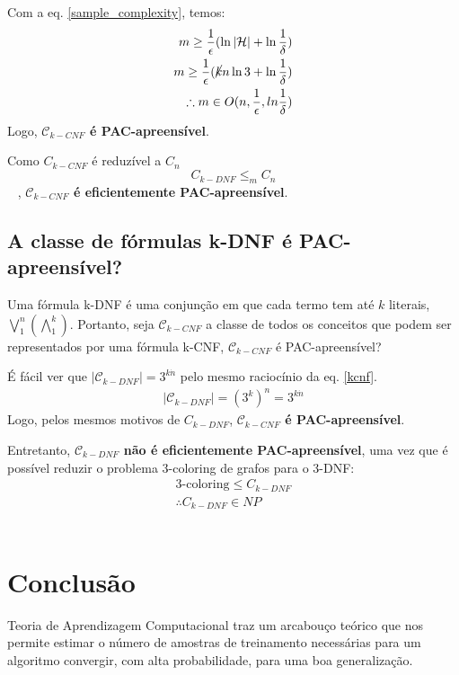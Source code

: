 \documentclass[
10pt, %
a4paper, %
onecolumn, %
]{article}
\begin{document}
Com a eq. \ref{sample_complexity}, temos:
\begin{align}
    m \geq \frac{1}{\epsilon}(\ln{|\mathcal{H}|} + \ln{\frac{1}{\delta}})\\
    m \geq \frac{1}{\epsilon}(\cancel{k} n \ln{3} + \ln{\frac{1}{\delta}}) \\
    \therefore m \in O(n, \frac{1}{\epsilon}, ln{\frac{1}{\delta}}) 
\end{align}
Logo, \textbf{$\mathcal{C}_{k-CNF}$ é PAC-apreensível}. 

Como $C_{k-CNF}$ é reduzível a $C_n$ \begin{equation}
C_{k-DNF}\leq_{m}C_n \end{equation}~\cite[pg. 18]{FoundationsML}
, \textbf{$\mathcal{C}_{k-CNF}$ é eficientemente PAC-apreensível}. 


\subsection{A classe de fórmulas k-DNF é PAC-apreensível?}
Uma fórmula k-DNF é uma conjunção em que cada termo tem até $k$ literais, $\bigvee_{1}^{n}(\bigwedge_{1}^{k})$. Portanto, seja $\mathcal{C}_{k-CNF}$ a classe de todos os conceitos que podem ser representados por uma fórmula k-CNF, $\mathcal{C}_{k-CNF}$ é PAC-apreensível?

É fácil ver que $|\mathcal{C}_{k-DNF}| = 3 ^{k \dot n}$ pelo mesmo raciocínio da eq. \ref{kcnf}. 
\begin{align}
    |\mathcal{C}_{k-DNF}| = (3^k)^n = 3 ^{k \dot n}
\end{align}
Logo, pelos mesmos motivos de $C_{k-DNF}$, \textbf{$\mathcal{C}_{k-CNF}$ é PAC-apreensível}. 

Entretanto, \textbf{$\mathcal{C}_{k-DNF}$ não é eficientemente PAC-apreensível}, uma vez que é possível reduzir o problema 3-coloring de grafos para o 3-DNF:
\begin{align}
\textrm{3-coloring} \leq C_{k-DNF} \\
\therefore C_{k-DNF} \in NP 
\end{align}
~\cite[pg. 17-18]{FoundationsML}

\section{Conclusão}

Teoria de Aprendizagem Computacional traz um arcabouço teórico que nos permite estimar o número de amostras de treinamento necessárias para um algoritmo convergir, com alta probabilidade, para uma boa generalização. 
\end{document}
